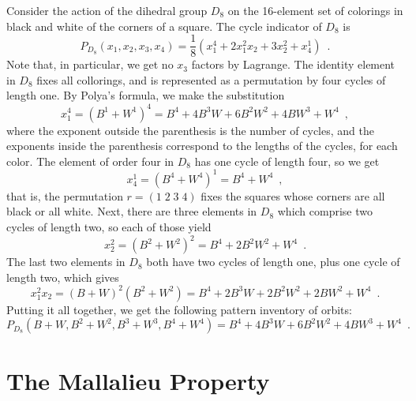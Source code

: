 \begin{example}
	\cite[249]{Tucker1974}
	Consider the action of the dihedral group $D_8$ on the 16-element set of colorings in
	black and white of the corners of a square. The cycle indicator of $D_8$ is
	\begin{equation}
		P_{D_8}(x_1, x_2, x_3, x_4) =
		\frac{1}{8}(x_1^4 + 2x_1^2x_2 + 3x_2^2 + x_4^1) \enspace.
	\end{equation}
	Note that, in particular, we get no $x_3$ factors by Lagrange. The identity element
	in $D_8$ fixes all collorings, and is represented as a permutation by four cycles
	of length one. By Polya's formula, we make the substitution
	\begin{equation}
		x_1^4 = (B^1 + W^1)^4 = B^4 + 4 B^3 W + 6 B^2 W^2 + 4 B W^3 + W^4 \enspace,
	\end{equation}
	where the exponent outside the parenthesis is the number of cycles, and the exponents
	inside the parenthesis correspond to the lengths of the cycles, for each color.
	The element of order four in $D_8$ has one cycle of length four, so we get
	\begin{equation}
		x_4^1 = (B^4 + W^4)^1 = B^4 + W^4 \enspace,
	\end{equation}
	that is, the permutation $r = (1 \; 2 \; 3 \; 4)$ fixes the squares whose corners are
	all black or all white. Next, there are three elements in $D_8$ which comprise
	two cycles of length two, so each of those yield
	\begin{equation}
		x_2^2 = (B^2 + W^2)^2 = B^4 + 2 B^2 W^2 + W^4 \enspace.
	\end{equation}
	The last two elements in $D_8$ both have two cycles of length one, plus one cycle
	of length two, which gives
	\begin{equation}
		x_1^2x_2 = (B + W)^2 (B^2 + W^2) =
		B^4 + 2 B^3 W + 2 B^2 W^2 + 2 B W^2 + W^4 \enspace.
	\end{equation}
	Putting it all together, we get the following pattern inventory of orbits:
	\begin{equation}
		P_{D_8}(B + W, B^2 + W^2, B^3 + W^3, B^4 + W^4) =
		B^4 + 4 B^3 W + 6 B^2 W^2 + 4 B W^3 + W^4 \enspace.
	\end{equation}
\end{example}

\chapter{The Mallalieu Property}
\label{mallalieu-section}

